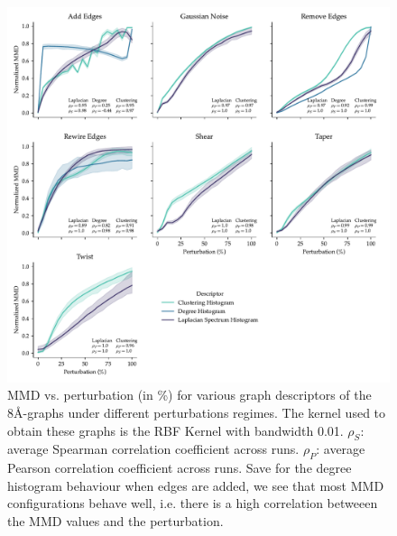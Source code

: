 \begin{figure}
  \centering
  \includegraphics[width=\textwidth]{./figures/results/res_1_1.pdf}
  \caption[Overall behaviour of MMD using graph-based descriptors.]{MMD vs.
perturbation (in \%) for various graph descriptors of the 8\si{\angstrom}-graphs
under different perturbations regimes. The kernel used to obtain these graphs is
the RBF Kernel with bandwidth 0.01. $\rho_{S}$: average Spearman correlation
coefficient across runs. $\rho_{P}$: average Pearson correlation coefficient
across runs. Save for the degree histogram behaviour when edges are added, we
see that most MMD configurations behave well, i.e. there is a high correlation
betweeen the MMD values and the perturbation.}
  \label{fig:mmd_consistent_eps}
\end{figure}


